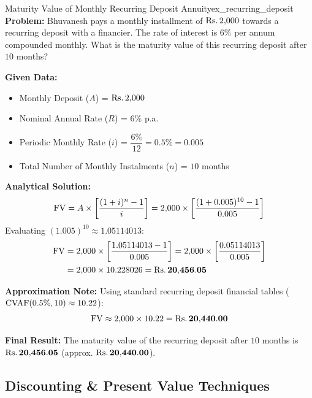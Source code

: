\begin{example}{Maturity Value of Monthly Recurring Deposit Annuity}{ex_recurring_deposit}
\textbf{Problem:}
Bhuvanesh pays a monthly installment of $\text{Rs.}\, 2{,}000$ towards a recurring deposit with a financier. The rate of interest is $6\%$ per annum compounded monthly. What is the maturity value of this recurring deposit after $10$ months?

\tcbline
\textbf{Given Data:}
\begin{itemize}[noitemsep]
    \item Monthly Deposit ($A$) = $\text{Rs.}\, 2{,}000$
    \item Nominal Annual Rate ($R$) = $6\%$ p.a.
    \item Periodic Monthly Rate ($i$) = $\dfrac{6\%}{12} = 0.5\% = 0.005$
    \item Total Number of Monthly Instalments ($n$) = $10$ months
\end{itemize}

\textbf{Analytical Solution:}
\begin{equation*}
    \operatorname{FV} = A \times \left[ \frac{(1 + i)^n - 1}{i} \right] = 2{,}000 \times \left[ \frac{(1 + 0.005)^{10} - 1}{0.005} \right]
\end{equation*}
Evaluating $(1.005)^{10} \approx 1.05114013$:
\begin{align*}
    \operatorname{FV} &= 2{,}000 \times \left[ \frac{1.05114013 - 1}{0.005} \right] = 2{,}000 \times \left[ \frac{0.05114013}{0.005} \right] \\
    &= 2{,}000 \times 10.228026 = \mathbf{\text{Rs.}\, 20{,}456.05}
\end{align*}

\textbf{Approximation Note:}
Using standard recurring deposit financial tables ($\operatorname{CVAF}(0.5\%, 10) \approx 10.22$):
\begin{equation*}
    \operatorname{FV} \approx 2{,}000 \times 10.22 = \mathbf{\text{Rs.}\, 20{,}440.00}
\end{equation*}

\textbf{Final Result:}
The maturity value of the recurring deposit after $10$ months is $\mathbf{\text{Rs.}\, 20{,}456.05}$ (approx. $\mathbf{\text{Rs.}\, 20{,}440.00}$).
\end{example}

\subsection{Discounting \& Present Value Techniques}

